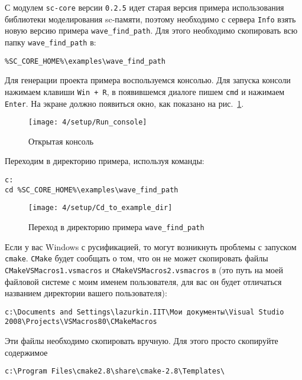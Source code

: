 С модулем \texttt{sc-core} версии \texttt{0.2.5} идет старая версия
примера использования библиотеки моделирования sc-памяти, поэтому
необходимо с сервера \texttt{Info} взять новую версию примера
\verb|wave_find_path|. Для этого необходимо скопировать всю папку \verb|wave_find_path| в:

\begin{verbatim}
%SC_CORE_HOME%\examples\wave_find_path
\end{verbatim}

Для генерации проекта примера воспользуемся консолью. Для запуска
консоли нажимаем клавиши \verb|Win + R|, в появившемся диалоге пишем
\verb|cmd| и нажимаем \texttt{Enter}. На экране должно появиться окно,
как показано на рис.~\ref{fig:Run_console}.

\begin{figure}[h!]
  \centering
  \texttt{[image: 4/setup/Run\_console]}
  \caption{Открытая консоль}
  \label{fig:Run_console}
\end{figure}

Переходим в директорию примера, используя команды:

\begin{verbatim}
c: 
cd %SC_CORE_HOME%\examples\wave_find_path
\end{verbatim}

\begin{figure}[h]
 \centering
 \texttt{[image: 4/setup/Cd\_to\_example\_dir]}
 \caption{Переход в директорию примера \texttt{wave\_find\_path}}
  \label{fig:cd_to_example_dir}
\end{figure}

Если у вас Windows с русификацией, то могут возникнуть проблемы с
запуском \texttt{cmake}. \texttt{CMake} будет сообщать о том, что он
не может скопировать файлы \verb|CMakeVSMacros1.vsmacros| и
\verb|CMakeVSMacros2.vsmacros| в (это путь на моей файловой системе с
моим именем пользователя, для вас он будет отличаться названием
директории вашего пользователя):

{\footnotesize
\begin{verbatim}
c:\Documents and Settings\lazurkin.IIT\Мои документы\Visual Studio 2008\Projects\VSMacros80\CMakeMacros
\end{verbatim}
}

Эти файлы необходимо скопировать вручную. Для этого просто скопируйте
содержимое

{\footnotesize
\begin{verbatim}
c:\Program Files\cmake2.8\share\cmake-2.8\Templates\
\end{verbatim}
}

